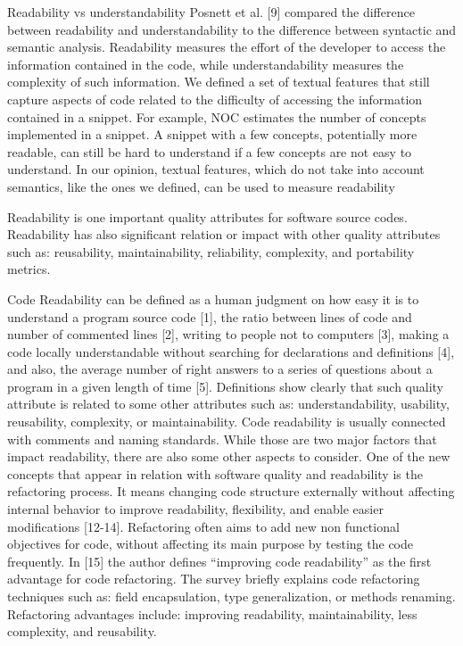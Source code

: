 \documentclass[%
class=scrreprt,
chapterprefix=false,%
open=right,%
twoside=false,%
paper=a4,%
logofile={Logo\_zentral\_farbig\_EN.png},%
thesistype=master,%
UKenglish,%
]{se2thesis}
\begin{document}
	Readability vs understandability
	Posnett et al. [9] compared the difference between readability and understandability to the difference
	between syntactic and semantic analysis. Readability measures the effort of the developer to access
	the information contained in the code, while understandability measures the complexity of such
	information. We defined a set of textual features that still capture aspects of code related to the
	difficulty of accessing the information contained in a snippet. For example, NOC estimates the
	number of concepts implemented in a snippet. A snippet with a few concepts, potentially more
	readable, can still be hard to understand if a few concepts are not easy to understand. In our opinion,
	textual features, which do not take into account semantics, like the ones we defined, can be used to
	measure readability
	\cite{scalabrino2018comprehensive}
	
	
	Readability is one important quality attributes for software source codes. Readability has
	also significant relation or impact with other quality attributes such as: reusability,
	maintainability, reliability, complexity, and portability metrics.\cite{tashtoush2013impact}
	
	Code Readability can be defined as a human judgment on how easy it is to understand a
	program source code [1], the ratio between lines of code and number of commented lines [2],
	writing to people not to computers [3], making a code locally understandable without
	searching for declarations and definitions [4], and also, the average number of right answers
	to a series of questions about a program in a given length of time [5]. Definitions show clearly
	that such quality attribute is related to some other attributes such as: understandability,
	usability, reusability, complexity, or maintainability. 
	Code readability is usually connected with comments and naming standards. While
	those are two major factors that impact readability, there are also some other aspects to
	consider.
	One of the new concepts that appear in relation with software quality and readability
	is the refactoring process. It means changing code structure externally without affecting
	internal behavior to improve readability, flexibility, and enable easier modifications
	[12-14]. Refactoring often aims to add new non functional objectives for code, without
	affecting its main purpose by testing the code frequently.
	In [15] the author defines “improving code readability” as the first advantage for
	code refactoring. The survey briefly explains code refactoring techniques such as: field
	encapsulation, type generalization, or methods renaming. Refactoring advantages
	include: improving readability, maintainability, less complexity, and reusability.
	\cite{tashtoush2013impact}
	
\end{document}
